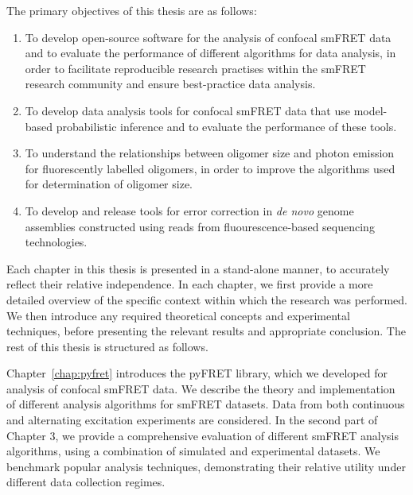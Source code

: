The primary objectives of this thesis are as follows:

\begin{enumerate}

\item To develop open-source software for the analysis of confocal smFRET data and to evaluate the performance of different algorithms for data analysis, in order to facilitate reproducible research practises within the smFRET research community and ensure best-practice data analysis.

\item To develop data analysis tools for confocal smFRET data that use model-based probabilistic inference and to evaluate the performance of these tools.

\item To understand the relationships between oligomer size and photon emission for fluorescently labelled oligomers, in order to improve the algorithms used for determination of oligomer size.

\item To develop and release tools for error correction in \emph{de novo} genome assemblies constructed using reads from fluourescence-based sequencing technologies.    

\end{enumerate}

Each chapter in this thesis is presented in a stand-alone manner, to accurately reflect their relative independence. In each chapter, we first provide a more detailed overview of the specific context within which the research was performed. We then introduce any required theoretical concepts and experimental techniques, before presenting the relevant results and appropriate conclusion. The rest of this thesis is structured as follows.

Chapter~\ref{chap:pyfret} introduces the pyFRET library, which we developed for analysis of confocal smFRET data. We describe the theory and implementation of different analysis algorithms for smFRET datasets. Data from both continuous and alternating excitation experiments are considered. In the second part of Chapter 3, we provide a comprehensive evaluation of different smFRET analysis algorithms, using a combination of simulated and experimental datasets. We benchmark popular analysis techniques, demonstrating their relative utility under different data collection regimes. 



